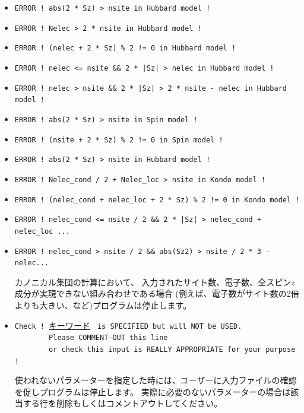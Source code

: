 \begin{itemize}
\item \verb#ERROR ! abs(2 * Sz) > nsite in Hubbard model !# \vspace{-0.3cm}
\item \verb#ERROR ! Nelec > 2 * nsite in Hubbard model !#\vspace{-0.3cm}
\item \verb#ERROR ! (nelec + 2 * Sz) % 2 != 0 in Hubbard model !#\vspace{-0.3cm}
\item \verb#ERROR ! nelec <= nsite && 2 * |Sz| > nelec in Hubbard model !#\vspace{-0.3cm}
\item \verb#ERROR ! nelec > nsite && 2 * |Sz| > 2 * nsite - nelec in Hubbard model !#\vspace{-0.3cm}
\item \verb#ERROR ! abs(2 * Sz) > nsite in Spin model !#\vspace{-0.3cm}
\item \verb#ERROR ! (nsite + 2 * Sz) % 2 != 0 in Spin model !#\vspace{-0.3cm}
\item \verb#ERROR ! abs(2 * Sz) > nsite in Hubbard model !#\vspace{-0.3cm}
\item \verb#ERROR ! Nelec_cond / 2 + Nelec_loc > nsite in Kondo model !#\vspace{-0.3cm}
\item \verb#ERROR ! (nelec_cond + nelec_loc + 2 * Sz) % 2 != 0 in Kondo model !#\vspace{-0.3cm}
\item \verb#ERROR ! nelec_cond <= nsite / 2 && 2 * |Sz| > nelec_cond + nelec_loc ...#\vspace{-0.3cm}
\item \verb#ERROR ! nelec_cond > nsite / 2 && abs(Sz2) > nsite / 2 * 3 - nelec...#

カノニカル集団の計算において、
入力されたサイト数、電子数、全スピン$z$成分が実現できない組み合わせである場合
(例えば、電子数がサイト数の2倍よりも大きい、など)プログラムは停止します。

\item \verb|Check ! |\underline{キーワード} \verb| is SPECIFIED but will NOT be USED.|\\
      \verb|        Please COMMENT-OUT this line|\\
      \verb|        or check this input is REALLY APPROPRIATE for your purpose !|

使われないパラメーターを指定した時には、ユーザーに入力ファイルの確認を促しプログラムは停止します。
実際に必要のないパラメーターの場合は該当する行を削除もしくはコメントアウトしてください。


\end{itemize}
